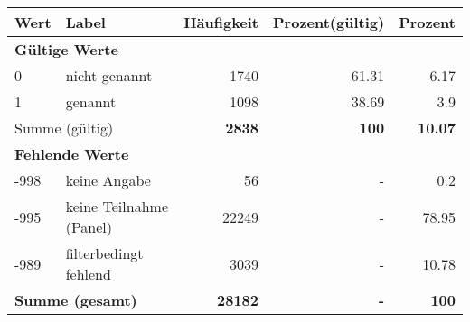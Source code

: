      \begin{longtable}{lXrrr}
     \toprule
     \textbf{Wert} & \textbf{Label} & \textbf{Häufigkeit} & \textbf{Prozent(gültig)} & \textbf{Prozent} \\
     \endhead
     \midrule
     \multicolumn{5}{l}{\textbf{Gültige Werte}}\\

     0 &
     \multicolumn{1}{X}{ nicht genannt   } &


       \num{1740} &
       \num[round-mode=places,round-precision=2]{61,31} &
         \num[round-mode=places,round-precision=2]{6,17} \\

     1 &
     \multicolumn{1}{X}{ genannt   } &


       \num{1098} &
       \num[round-mode=places,round-precision=2]{38,69} &
         \num[round-mode=places,round-precision=2]{3,9} \\
     \midrule
     \multicolumn{2}{l}{Summe (gültig)} &
       \textbf{\num{2838}} &
     \textbf{100} &
       \textbf{\num[round-mode=places,round-precision=2]{10,07}} \\
     \multicolumn{5}{l}{\textbf{Fehlende Werte}}\\
       -998 &
       keine Angabe &
         \num{56} &
        - &
         \num[round-mode=places,round-precision=2]{0,2} \\
       -995 &
       keine Teilnahme (Panel) &
         \num{22249} &
        - &
         \num[round-mode=places,round-precision=2]{78,95} \\
       -989 &
       filterbedingt fehlend &
         \num{3039} &
        - &
         \num[round-mode=places,round-precision=2]{10,78} \\
     \midrule
     \multicolumn{2}{l}{\textbf{Summe (gesamt)}} &
          \textbf{\num{28182}} &
        \textbf{-} &
        \textbf{100} \\
     \bottomrule
     \end{longtable}
     
